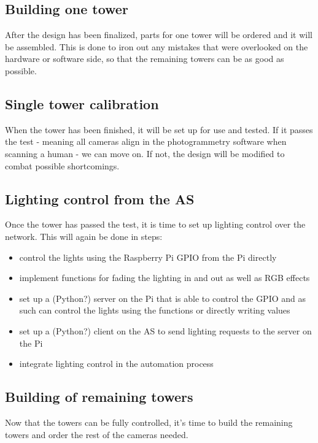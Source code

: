 \subsection{Building one tower}
	After the design has been finalized, parts for one tower will be ordered and it will be assembled. This is done to iron out any mistakes that were overlooked on the hardware or software side, so that the remaining towers can be as good as possible.
	
\subsection{Single tower calibration}
	When the tower has been finished, it will be set up for use and tested. If it passes the test - meaning all cameras align in the photogrammetry software when scanning a human - we can move on. If not, the design will be modified to combat possible shortcomings.
	
\subsection{Lighting control from the AS}
	Once the tower has passed the test, it is time to set up lighting control over the network. This will again be done in steps:
	\begin{itemize}
		\item control the lights using the Raspberry Pi GPIO from the Pi directly
		\item implement functions for fading the lighting in and out as well as RGB effects
		\item set up a (Python?) server on the Pi that is able to control the GPIO and as such can control the lights using the functions or directly writing values
		\item set up a (Python?) client on the AS to send lighting requests to the server on the Pi
		\item integrate lighting control in the automation process
	\end{itemize}
	
\subsection{Building of remaining towers}	
	Now that the towers can be fully controlled, it's time to build the remaining towers and order the rest of the cameras needed.
	

